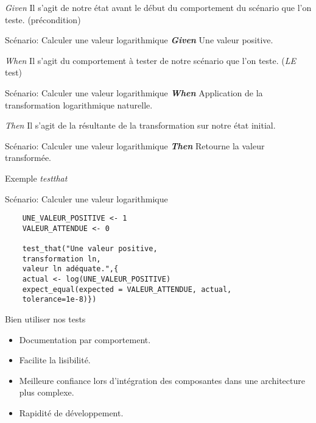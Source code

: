 \documentclass[11pt]{beamer}
\begin{document}
\begin{frame}{\textit{Given}}
Il s'agit de notre état avant le début du comportement du scénario que l'on teste. (précondition)

\begin{block}{Scénario: Calculer une valeur logarithmique}
\textit{\textbf{Given}} Une valeur positive.
\end{block}
\end{frame}

\begin{frame}{\textit{When}}
Il s'agit du comportement à tester de notre scénario que l'on teste. (\emph{LE} test)

\begin{block}{Scénario: Calculer une valeur logarithmique}
\textit{\textbf{When}} Application de la transformation logarithmique naturelle.
\end{block}
\end{frame}

\begin{frame}{\textit{Then}}
Il s'agit de la résultante de la transformation sur notre état initial.
\begin{block}{Scénario: Calculer une valeur logarithmique}
\textit{\textbf{Then}} Retourne la valeur transformée.
\end{block}
\end{frame}

\begin{frame}[fragile]{Exemple \textit{testthat}}
\begin{block}{Scénario: Calculer une valeur logarithmique}
	\begin{lstlisting}
	UNE_VALEUR_POSITIVE <- 1
	VALEUR_ATTENDUE <- 0
	
	test_that("Une valeur positive,
	transformation ln,
	valeur ln adéquate.",{
	actual <- log(UNE_VALEUR_POSITIVE)
	expect_equal(expected = VALEUR_ATTENDUE, actual, 
	tolerance=1e-8)})
	\end{lstlisting}
\end{block}
\end{frame}

\begin{frame}{Bien utiliser nos tests}
\begin{itemize}
\item Documentation par comportement.
\item Facilite la lisibilité.
\item Meilleure confiance lors d'intégration des composantes dans une architecture plus complexe.
\item Rapidité de développement.
\end{itemize}
\end{frame}
\end{document}
